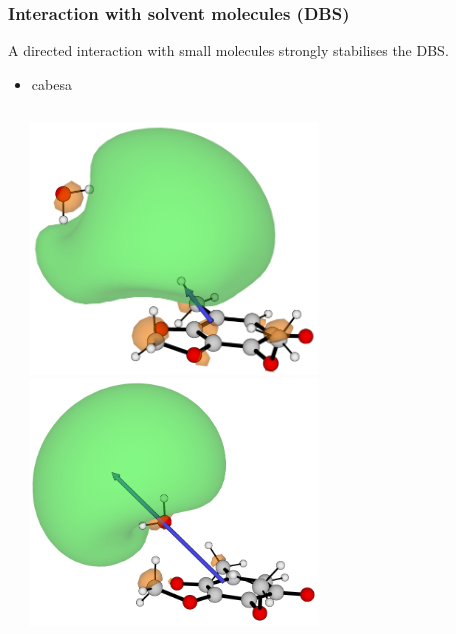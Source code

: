 \documentclass[9pt,t,xcolor=table]{beamer}
\begin{document}
\begin{frame}
\begin{columns}[c]
\begin{column}{0.3\textwidth}
		\end{column}
	\end{columns}		
\end{frame}

\begin{frame}
	\frametitle{\huge Interaction with solvent molecules (DBS)}\large
	A directed interaction with small molecules strongly stabilises the DBS.\\
	\begin{itemize}
		\item cabesa
	\end{itemize}
	\vspace{5pt}
	\begin{columns}[c]
		\begin{column}{0.7\textwidth}
			\centering
			\small	
			
		\end{column}
		\hspace{40pt}
		\begin{column}{0.3\textwidth}
			\centering
	 		\includegraphics[width=0.6\textwidth]{Figs/Q0_H2O_H.png}\\
			\vfill
			\includegraphics[width=0.6\textwidth]{Figs/Q0_H2O_O.png}	
		\end{column}
	\end{columns}		
\end{frame}
\end{document}
